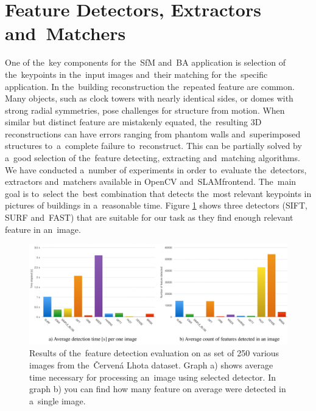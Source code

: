 \section{Feature Detectors, Extractors and~Matchers}
\label{sec:experiments-extractors}
One of the~key components for the~SfM and~BA application is selection of the~keypoints in the~input images and~their matching for the~specific application.  In the~building reconstruction the~repeated feature are common. Many objects, such as clock towers with nearly identical sides, or domes with strong radial symmetries, pose challenges for structure from motion. When similar but distinct feature are mistakenly equated, the~resulting 3D reconstructions can have errors ranging from phantom walls and~superimposed structures to~a~complete failure to~reconstruct. This can be partially solved by a~good selection of the~feature detecting, extracting and~matching algorithms. We have conducted a~number of experiments in order to~evaluate the~detectors, extractors and~matchers available in OpenCV and~SLAM\textunderscore frontend. The~main goal is to~select the~best combination that detects the~most relevant keypoints in pictures of buildings in a~reasonable time. Figure \ref{fig:detectors} shows three detectors (SIFT, SURF and~FAST) that are suitable for our task as they find enough relevant feature in an~image.

\begin{figure}[!htbp]
	\begin{center}
		\includegraphics[keepaspectratio,width=\textwidth]{fig/detectors.pdf}
	\end{center}
	\caption{Results of the~feature detection evaluation on as set of 250 various images from the~Červená Lhota dataset. Graph a) shows average time necessary for processing an~image using selected detector. In graph b) you can find how many feature on average were detected in a~single image.}
	\label{fig:detectors}
\end{figure}

